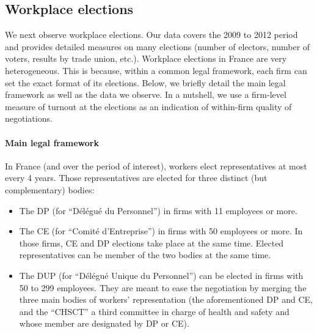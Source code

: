  


\FloatBarrier
\subsection{Workplace elections\label{appsec:elec_data}}
We next observe workplace elections. Our data covers the 2009 to 2012 period and provides detailed measures on many elections (number of electors, number of voters, results by trade union, etc.). Workplace elections in France are very heterogeneous. This is because, within a common legal framework, each firm can set the exact format of its elections. Below, we briefly detail the main legal framework as well as the data we observe. In a nutshell, we use a firm-level measure of turnout at the elections as an indication of within-firm quality of negotiations.


\paragraph{Main legal framework}
In France (and over the period of interest), workers elect representatives at most every 4 years. Those representatives are elected for three distinct (but complementary) bodies:
\begin{itemize}
\item[-] The DP (for ``Délégué du Personnel'') in firms with 11 employees or more.

\item[-] The CE (for ``Comité d'Entreprise'') in firms with 50 employees or more. In those firms, CE and DP elections take place at the same time. Elected representatives can be member of the two bodies at the same time.

\item[-] The DUP (for ``Délégué Unique du Personnel'') can be elected in firms with 50 to 299 employees. They are meant to ease the negotiation by merging the three main bodies of workers' representation (the aforementioned DP and CE, and the ``CHSCT'' a third committee in charge of health and safety and whose member are designated by DP or CE).
\end{itemize}


